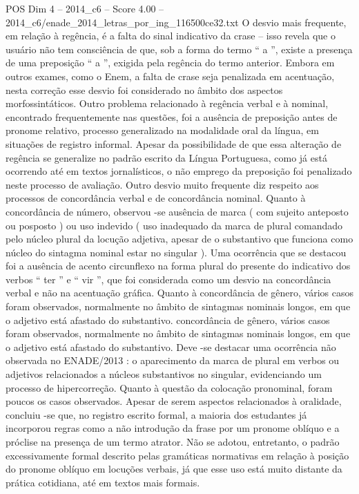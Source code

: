 \begin{textsample}{POS Dim 4 – 2014\_c6 – Score 4.00 – 2014\_c6/enade\_2014\_letras\_por\_ing\_116500ce32.txt}
O desvio mais frequente, em relação à regência, é a falta do sinal indicativo da crase – isso revela que o usuário não tem consciência de que, sob a forma do termo “ a ”, existe a presença de uma preposição “ a ”, exigida pela regência do termo anterior.
Embora em outros exames, como o Enem, a falta de crase seja penalizada em acentuação, nesta correção esse desvio foi considerado no âmbito dos aspectos morfossintáticos.
Outro problema relacionado à regência verbal e à nominal, encontrado frequentemente nas questões, foi a ausência de preposição antes de pronome relativo, processo generalizado na modalidade oral da língua, em situações de registro informal.
Apesar da possibilidade de que essa alteração de regência se generalize no padrão escrito da Língua Portuguesa, como já está ocorrendo até em textos jornalísticos, o não emprego da preposição foi penalizado neste processo de avaliação.
Outro desvio muito frequente diz respeito aos processos de concordância verbal e de concordância nominal.
Quanto à concordância de número, observou -se ausência de marca ( com sujeito anteposto ou posposto ) ou uso indevido ( uso inadequado da marca de plural comandado pelo núcleo plural da locução adjetiva, apesar de o substantivo que funciona como núcleo do sintagma nominal estar no singular ).
Uma ocorrência que se destacou foi a ausência de acento circunflexo na forma plural do presente do indicativo dos verbos “ ter ” e “ vir ”, que foi considerada como um desvio na concordância verbal e não na acentuação gráfica.
Quanto à concordância de gênero, vários casos foram observados, normalmente no âmbito de sintagmas nominais longos, em que o adjetivo está afastado do substantivo. concordância de gênero, vários casos foram observados, normalmente no âmbito de sintagmas nominais longos, em que o adjetivo está afastado do substantivo.
Deve -se destacar uma ocorrência não observada no ENADE/2013 : o aparecimento da marca de plural em verbos ou adjetivos relacionados a núcleos substantivos no singular, evidenciando um processo de hipercorreção.
Quanto à questão da colocação pronominal, foram poucos os casos observados.
Apesar de serem aspectos relacionados à oralidade, concluiu -se que, no registro escrito formal, a maioria dos estudantes já incorporou regras como a não introdução da frase por um pronome oblíquo e a próclise na presença de um termo atrator.
Não se adotou, entretanto, o padrão excessivamente formal descrito pelas gramáticas normativas em relação à posição do pronome oblíquo em locuções verbais, já que esse uso está muito distante da prática cotidiana, até em textos mais formais.

\end{textsample}

